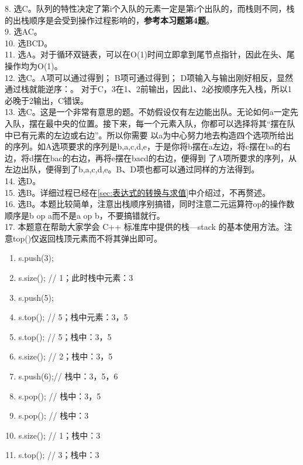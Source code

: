     8. 选C。队列的特性决定了第i个入队的元素一定是第i个出队的，而栈则不同，栈的出栈顺序是会受到操作过程影响的，{\color{red}\textbf{参考本习题第4题}}。\\

    9. 选AC。\\

    10. 选BCD。\\

    11. 选A。对于循环双链表，可以在O(1)时间立即拿到尾节点指针，因此在头、尾操作均为O(1)。\\

    12. 选C。A项可以通过得到；
    B项可通过得到；
    D项输入与输出刚好相反，显然通过栈就能逆序：。
    对于C，3在1、2前输出，因此1、2必按顺序先入栈，所以1必晚于2输出，C错误。\\

    13. 选C。这是一个非常有意思的题。不妨假设仅有左边能出队。无论如何a一定先入队，摆在最中央的位置。接下来，每一个元素入队，你都可以选择将其“摆在队中已有元素的左边或右边”。所以你需要
    以a为中心努力地去构造四个选项所给出的序列。如A选项要求的序列是b,a,c,d,e，于是你将b摆在a左边，将c摆在ba的右边，将d摆在bac的右边，再将e摆在bacd的右边，便得到
    了A项所要求的序列，从左边出队，便得到了b,a,c,d,e。B、D项也都可以通过同样的方法得到。\\

    14. 选D。\\

    15. 选B。详细过程已经在\ref{sec:表达式的转换与求值}中介绍过，不再赘述。\\

    16. 选B。本题比较简单，注意出栈顺序别搞错，同时注意二元运算符op的操作数顺序是b op a而不是a op b，不要搞错就行。\\

    17. 本题意在帮助大家学会 C++ 标准库中提供的栈---stack 的基本使用方法。注意top()仅返回栈顶元素而不将其弹出即可。
    \begin{enumerate}[label=\arabic*）]
        \item s.push(3);
        \item s.size(); // 1；此时栈中元素：3
        \item s.push(5);
        \item s.top();  // 5；栈中元素：3，5
        \item s.top();  // 5；栈中：3，5
        \item s.size(); // 2；栈中：3，5
        \item s.push(6);// 栈中：3，5，6
        \item s.pop();  // 栈中：3，5
        \item s.pop();  // 栈中：3
        \item s.size(); // 1；栈中：3
        \item s.top();  // 3；栈中：3
    \end{enumerate}

